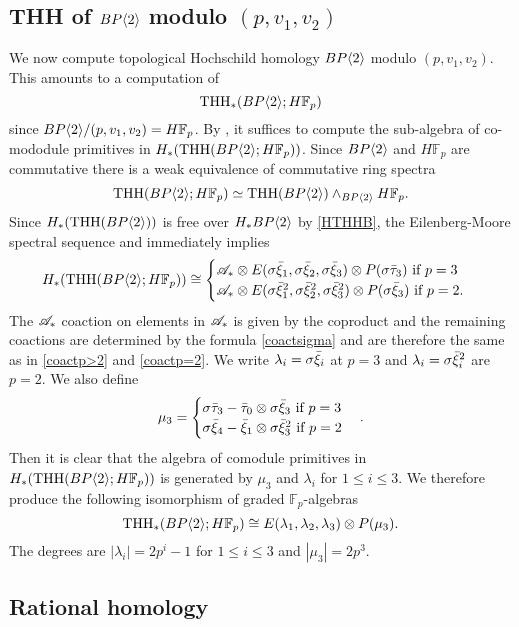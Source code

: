 \subsection{THH of $BP\langle 2 \rangle$ modulo $(p,v_1,v_2)$}
We now compute topological Hochschild homology $BP\langle 2 \rangle$ modulo $(p,v_1,v_2)$. This amounts to a computation of 
\[\operatorname{THH}_*(BP\langle 2 \rangle;H\mathbb{F}_p)\] 
since $BP\langle 2 \rangle/(p,v_1,v_2)=H\mathbb{F}_p$. By \cite[Lem. 4.1]{AngeltveitRognes}, it suffices to compute the sub-algebra of co-mododule primitives in $H_*(\operatorname{THH}(BP\langle 2 \rangle;H\mathbb{F}_p))$. Since $BP\langle 2 \rangle$ and $H\mathbb{F}_p$ are commutative there is a weak equivalence of commutative ring spectra
\[ \operatorname{THH}(BP\langle 2 \rangle;H\mathbb{F}_p)\simeq \operatorname{THH}(BP\langle 2 \rangle)\wedge_{BP\langle 2 \rangle} H\mathbb{F}_p. \] 
Since $H_*(\operatorname{THH}(BP\langle 2 \rangle))$ is free over $H_*BP\langle 2 \rangle$ by \eqref{HTHHB}, the Eilenberg-Moore spectral sequence and \cite[Cor. 5.13]{AngeltveitRognes} immediately implies
\begin{equation}\label{eqn:HTHH(R;F_p)}
H_*(\operatorname{THH}(BP\langle 2 \rangle;H\mathbb{F}_p))\cong \begin{cases} \mathscr{A}_* \otimes E(\sigma \bar{\xi}_1, \sigma \bar{\xi}_2, \sigma \bar{\xi}_3)\otimes P(\sigma \bar{\tau}_3) \text{ if } p=3 \\  \mathscr{A}_* \otimes E(\sigma \bar{\xi}_1^2, \sigma \bar{\xi}_2^2, \sigma \bar{\xi}_3^2)\otimes P(\sigma \bar{\xi}_3) \text{ if } p=2. \end{cases}
\end{equation}
The $\mathscr{A}_*$ coaction on elements in $\mathscr{A}_*$ is given by the coproduct and the remaining coactions are determined by the formula \eqref{coactsigma} and are therefore the same as in \eqref{coactp>2} and \eqref{coactp=2}. We write $\lambda_i=\sigma\bar{\xi}_i$ at $p=3$ and $\lambda_i=\sigma \bar{\xi}_i^2$ are $p=2$. We also define 
\[ \mu_3=\begin{cases} \sigma \bar{\tau}_3 -\bar{\tau}_0\otimes \sigma \bar{\xi}_3 \text{ if } p=3 \\ \sigma \bar{\xi}_4-\bar{\xi}_1\otimes \sigma \bar{\xi}^2_3 \text{ if } p=2 \end{cases}. \]
Then it is clear that the algebra of comodule primitives in $H_*(\operatorname{THH}(BP\langle 2 \rangle ;H\mathbb{F}_p))$ is generated by $\mu_3$ and $\lambda_i$ for $1\le i\le 3$. We therefore produce the following isomorphism of graded $\mathbb{F}_p$-algebras
\begin{equation}\label{eqn:THH(R;F_p)}
\operatorname{THH}_*(BP\langle 2 \rangle;H\mathbb{F}_p)\cong E(\lambda_1, \lambda_2, \lambda_3)\otimes P(\mu_3).
\end{equation}
The degrees are $|\lambda_i|=2p^i-1$ for $1\le i\le 3$ and $|\mu_3| = 2p^3$. 

\subsection{Rational homology}

